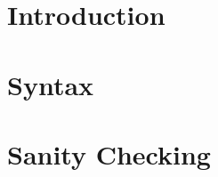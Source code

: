 \documentclass{report}[10pt]
\begin{document}
\sloppypar





\tableofcontents

\chapter{Introduction}
\label{Introduction}


\chapter{Syntax}
\label{Syntax}



\chapter{Sanity Checking}
\label{Debugging}






\newpage

\cleardoublepage

\printindex[com]
\printindex[var]
\printindex
\end{document}
